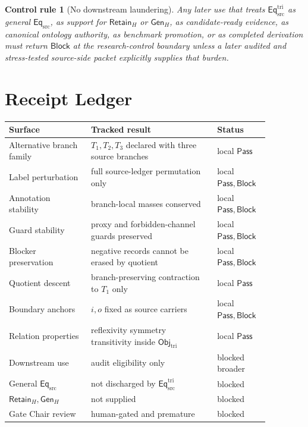 \documentclass[11pt]{article}
\newcommand{\EqSrc}{\mathsf{Eq}_{\mathrm{src}}}
\newcommand{\EqTri}{\mathsf{Eq}_{\mathrm{src}}^{\mathrm{tri}}}
\newcommand{\ObjTri}{\mathsf{Obj}_{\mathrm{tri}}}
\newcommand{\RetainH}{\mathsf{Retain}_{H}}
\newcommand{\GenH}{\mathsf{Gen}_{H}}
\newcommand{\Pass}{\mathsf{Pass}}
\newcommand{\Block}{\mathsf{Block}}
\newtheorem{controlrule}{Control rule}
\begin{document}
\begin{controlrule}[No downstream laundering]
Any later use that treats \(\EqTri\) as general \(\EqSrc\), as support
for \(\RetainH\) or \(\GenH\), as candidate-ready evidence, as canonical
ontology authority, as benchmark promotion, or as completed derivation
must return \(\Block\) at the research-control boundary unless a later
audited and stress-tested source-side packet explicitly supplies that
burden.
\end{controlrule}

\section{Receipt Ledger}

\begin{center}
\begin{tabular}{p{0.28\linewidth}p{0.43\linewidth}p{0.16\linewidth}}
\textbf{Surface} & \textbf{Tracked result} & \textbf{Status} \\
\hline
Alternative branch family & \(T_{1},T_{2},T_{3}\) declared with three source branches & local \(\Pass\) \\
Label perturbation & full source-ledger permutation only & local \(\Pass,\Block\) \\
Annotation stability & branch-local masses conserved & local \(\Pass,\Block\) \\
Guard stability & proxy and forbidden-channel guards preserved & local \(\Pass,\Block\) \\
Blocker preservation & negative records cannot be erased by quotient & local \(\Pass,\Block\) \\
Quotient descent & branch-preserving contraction to \(T_{1}\) only & local \(\Pass\) \\
Boundary anchors & \(i,o\) fixed as source carriers & local \(\Pass,\Block\) \\
Relation properties & reflexivity symmetry transitivity inside \(\ObjTri\) & local \(\Pass\) \\
Downstream use & audit eligibility only & blocked broader \\
General \(\EqSrc\) & not discharged by \(\EqTri\) & blocked \\
\(\RetainH,\GenH\) & not supplied & blocked \\
Gate Chair review & human-gated and premature & blocked \\
\end{tabular}
\end{center}
\end{document}
